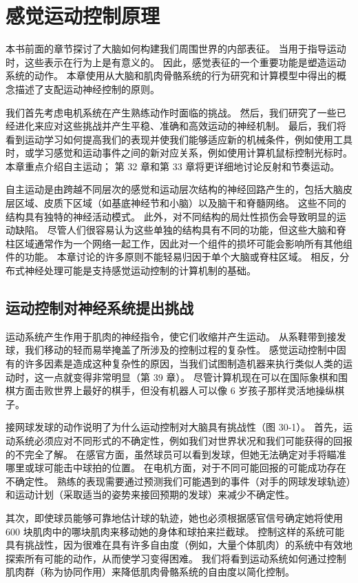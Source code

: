 \chapter{感觉运动控制原理} \label{chap:chap30}

本书前面的章节探讨了大脑如何构建我们周围世界的内部表征。 当用于指导运动时，这些表示在行为上是有意义的。 因此，感觉表征的一个重要功能是塑造运动系统的动作。 本章使用从大脑和肌肉骨骼系统的行为研究和计算模型中得出的概念描述了支配运动神经控制的原则。

我们首先考虑电机系统在产生熟练动作时面临的挑战。 然后，我们研究了一些已经进化来应对这些挑战并产生平稳、准确和高效运动的神经机制。 最后，我们将看到运动学习如何提高我们的表现并使我们能够适应新的机械条件，例如使用工具时，或学习感觉和运动事件之间的新对应关系，例如使用计算机鼠标控制光标时。 本章重点介绍自主运动； 第 32 章和第 33 章将更详细地讨论反射和节奏运动。

自主运动是由跨越不同层次的感觉和运动层次结构的神经回路产生的，包括大脑皮层区域、皮质下区域（如基底神经节和小脑）以及脑干和脊髓网络。 这些不同的结构具有独特的神经活动模式。 此外，对不同结构的局灶性损伤会导致明显的运动缺陷。 尽管人们很容易认为这些单独的结构具有不同的功能，但这些大脑和脊柱区域通常作为一个网络一起工作，因此对一个组件的损坏可能会影响所有其他组件的功能。 本章讨论的许多原则不能轻易归因于单个大脑或脊柱区域。 相反，分布式神经处理可能是支持感觉运动控制的计算机制的基础。

\section{运动控制对神经系统提出挑战}

运动系统产生作用于肌肉的神经指令，使它们收缩并产生运动。 从系鞋带到接发球，我们移动的轻而易举掩盖了所涉及的控制过程的复杂性。 感觉运动控制中固有的许多因素是造成这种复杂性的原因，当我们试图制造机器来执行类似人类的运动时，这一点就变得非常明显（第 39 章）。 尽管计算机现在可以在国际象棋和围棋方面击败世界上最好的棋手，但没有机器人可以像 6 岁孩子那样灵活地操纵棋子。

接网球发球的动作说明了为什么运动控制对大脑具有挑战性（图 30-1）。 首先，运动系统必须应对不同形式的不确定性，例如我们对世界状况和我们可能获得的回报的不完全了解。 在感官方面，虽然球员可以看到发球，但她无法确定对手将瞄准哪里或球可能击中球拍的位置。 在电机方面，对于不同可能回报的可能成功存在不确定性。 熟练的表现需要通过预测我们可能遇到的事件（对手的网球发球轨迹）和运动计划（采取适当的姿势来接回预期的发球）来减少不确定性。

其次，即使球员能够可靠地估计球的轨迹，她也必须根据感官信号确定她将使用 600 块肌肉中的哪块肌肉来移动她的身体和球拍来拦截球。 控制这样的系统可能具有挑战性，因为很难在具有许多自由度（例如，大量个体肌肉）的系统中有效地探索所有可能的动作，从而使学习变得困难。 我们将看到运动系统如何通过控制肌肉群（称为协同作用）来降低肌肉骨骼系统的自由度以简化控制。

